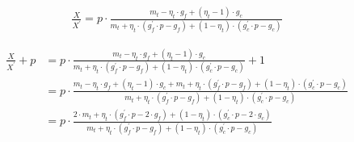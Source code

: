 \documentclass[american]{scrartcl}
\begin{document}
    \begin{equation}
        \begin{split}
            \frac{X}{X^\prime} = p \cdot \frac{m_t - \eta_t \cdot g_f + (\eta_t - 1) \cdot g_c}{m_t + \eta_t \cdot ( g^\prime_f \cdot p - g_f ) + (1 - \eta_t) \cdot (g^\prime_c \cdot p - g_c)}
        \end{split}
    \end{equation}

    \begin{equation}
        \begin{split}
            \frac{X}{X^\prime} + p &= p \cdot \frac{m_t - \eta_t \cdot g_f + (\eta_t - 1) \cdot g_c}{m_t + \eta_t \cdot ( g^\prime_f \cdot p - g_f ) + (1 - \eta_t) \cdot (g^\prime_c \cdot p - g_c)} + 1 \\
            &= p \cdot  \frac{m_t - \eta_t \cdot g_f + (\eta_t - 1) \cdot g_c + m_t + \eta_t \cdot ( g^\prime_f \cdot p - g_f ) + (1 - \eta_t) \cdot (g^\prime_c \cdot p - g_c)}{m_t + \eta_t \cdot ( g^\prime_f \cdot p - g_f ) + (1 - \eta_t) \cdot (g^\prime_c \cdot p - g_c)} \\
            &= p \cdot \frac{2 \cdot m_t + \eta_t \cdot (g^\prime_f \cdot p - 2\cdot g_f) + (1 - \eta_t) \cdot (g^\prime_c \cdot p - 2\cdot g_c)}{m_t + \eta_t \cdot ( g^\prime_f \cdot p - g_f ) + (1 - \eta_t) \cdot (g^\prime_c \cdot p - g_c)}
        \end{split}
    \end{equation}

\fi

\end{document}
